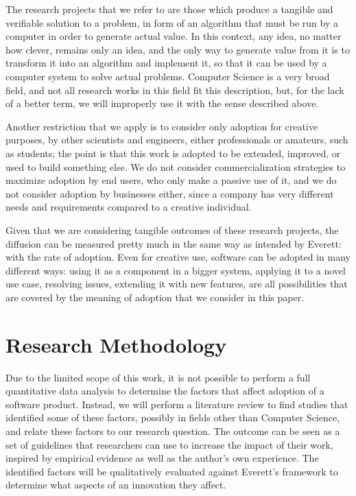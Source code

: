 \documentclass[12pt]{article}
\begin{document}
The research projects that we refer to are those which produce a tangible and verifiable solution to a problem, in form of an algorithm that must be run by a computer in order to generate actual value. In this context, any idea, no matter how clever, remains only an idea, and the only way to generate value from it is to transform it into an algorithm and implement it, so that it can be used by a computer system to solve actual problems. Computer Science is a very broad field, and not all research works in this field fit this description, but, for the lack of a better term, we will improperly use it with the sense described above.

Another restriction that we apply is to consider only adoption for creative purposes, by other scientists and engineers, either professionals or amateurs, such as students; the point is that this work is adopted to be extended, improved, or used to build something else. We do not consider commercialization strategies to maximize adoption by end users, who only make a passive use of it, and we do not consider adoption by businesses either, since a company has very different needs and requirements compared to a creative individual.

Given that we are considering tangible outcomes of these research projects, the diffusion can be measured pretty much in the same way as intended by Everett: with the rate of adoption. Even for creative use, software can be adopted in many different ways: using it as a component in a bigger system, applying it to a novel use case, resolving issues, extending it with new features, are all possibilities that are covered by the meaning of adoption that we consider in this paper.

\section{Research Methodology}
\label{sec:org049f2fe}
Due to the limited scope of this work, it is not possible to perform a full quantitative data analysis to determine the factors that affect adoption of a software product. Instead, we will perform a literature review to find studies that identified some of these factors, possibly in fields other than Computer Science, and relate these factors to our research question. The outcome can be seen as a set of guidelines that researchers can use to increase the impact of their work, inspired by empirical evidence as well as the author's own experience. The identified factors will be qualitatively evaluated against Everett's framework to determine what aspects of an innovation they affect.
\end{document}
